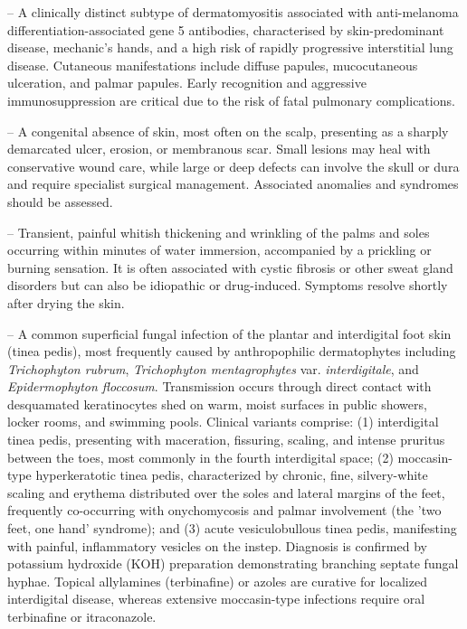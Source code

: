 -- A clinically distinct subtype of dermatomyositis associated with anti-melanoma differentiation-associated gene 5 antibodies, characterised by skin-predominant disease, mechanic's hands, and a high risk of rapidly progressive interstitial lung disease. Cutaneous manifestations include diffuse papules, mucocutaneous ulceration, and palmar papules. Early recognition and aggressive immunosuppression are critical due to the risk of fatal pulmonary complications.

-- A congenital absence of skin, most often on the scalp, presenting as a sharply demarcated ulcer, erosion, or membranous scar. Small lesions may heal with conservative wound care, while large or deep defects can involve the skull or dura and require specialist surgical management. Associated anomalies and syndromes should be assessed.

-- Transient, painful whitish thickening and wrinkling of the palms and soles occurring within minutes of water immersion, accompanied by a prickling or burning sensation. It is often associated with cystic fibrosis or other sweat gland disorders but can also be idiopathic or drug-induced. Symptoms resolve shortly after drying the skin.

-- A common superficial fungal infection of the plantar and interdigital foot skin (tinea pedis), most frequently caused by anthropophilic dermatophytes including \textit{Trichophyton rubrum}, \textit{Trichophyton mentagrophytes} var. \textit{interdigitale}, and \textit{Epidermophyton floccosum}. Transmission occurs through direct contact with desquamated keratinocytes shed on warm, moist surfaces in public showers, locker rooms, and swimming pools. Clinical variants comprise: (1) interdigital tinea pedis, presenting with maceration, fissuring, scaling, and intense pruritus between the toes, most commonly in the fourth interdigital space; (2) moccasin-type hyperkeratotic tinea pedis, characterized by chronic, fine, silvery-white scaling and erythema distributed over the soles and lateral margins of the feet, frequently co-occurring with onychomycosis and palmar involvement (the 'two feet, one hand' syndrome); and (3) acute vesiculobullous tinea pedis, manifesting with painful, inflammatory vesicles on the instep. Diagnosis is confirmed by potassium hydroxide (KOH) preparation demonstrating branching septate fungal hyphae. Topical allylamines (terbinafine) or azoles are curative for localized interdigital disease, whereas extensive moccasin-type infections require oral terbinafine or itraconazole.

